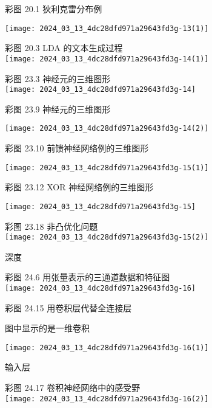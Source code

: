 \documentclass[10pt]{article}
\begin{document}
彩图 20.1 狄利克雷分布例

\begin{center}
\texttt{[image: 2024\_03\_13\_4dc28dfd971a29643fd3g-13(1)]}
\end{center}

彩图 20.3 LDA 的文本生成过程\\
\texttt{[image: 2024\_03\_13\_4dc28dfd971a29643fd3g-14(1)]}

彩图 23.3 神经元的三维图形\\
\texttt{[image: 2024\_03\_13\_4dc28dfd971a29643fd3g-14]}

彩图 23.9 神经元的三维图形

\begin{center}
\texttt{[image: 2024\_03\_13\_4dc28dfd971a29643fd3g-14(2)]}
\end{center}

彩图 23.10 前馈神经网络例的三维图形

\begin{center}
\texttt{[image: 2024\_03\_13\_4dc28dfd971a29643fd3g-15(1)]}
\end{center}

彩图 23.12 XOR 神经网络例的三维图形

\begin{center}
\texttt{[image: 2024\_03\_13\_4dc28dfd971a29643fd3g-15]}
\end{center}

彩图 23.18 非凸优化问题\\
\texttt{[image: 2024\_03\_13\_4dc28dfd971a29643fd3g-15(2)]}

深度

彩图 24.6 用张量表示的三通道数据和特征图\\
\texttt{[image: 2024\_03\_13\_4dc28dfd971a29643fd3g-16]}

彩图 24.15 用卷积层代替全连接层

图中显示的是一维卷积

\begin{center}
\texttt{[image: 2024\_03\_13\_4dc28dfd971a29643fd3g-16(1)]}
\end{center}

输入层

彩图 24.17 卷积神经网络中的感受野\\
\texttt{[image: 2024\_03\_13\_4dc28dfd971a29643fd3g-16(2)]}
\end{document}
